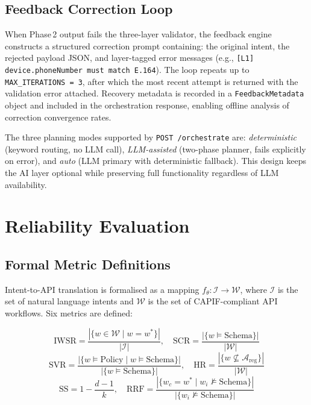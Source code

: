 \documentclass[conference]{IEEEtran}
\begin{document}
\subsection{Feedback Correction Loop}

When Phase\,2 output fails the three-layer validator, the feedback
engine constructs a structured correction prompt containing: the original
intent, the rejected payload JSON, and layer-tagged error messages
(e.g., \texttt{[L1] device.phoneNumber must match E.164}).
The loop repeats up to \texttt{MAX\_ITERATIONS\,=\,3}, after which the
most recent attempt is returned with the validation error attached.
Recovery metadata is recorded in a \texttt{FeedbackMetadata} object and
included in the orchestration response, enabling offline analysis of
correction convergence rates.

The three planning modes supported by \texttt{POST /orchestrate} are:
\textit{deterministic} (keyword routing, no LLM call),
\textit{LLM-assisted} (two-phase planner, fails explicitly on error), and
\textit{auto} (LLM primary with deterministic fallback).
This design keeps the AI layer optional while preserving full
functionality regardless of LLM availability.

\section{Reliability Evaluation}
\label{sec:eval}

\subsection{Formal Metric Definitions}

Intent-to-API translation is formalised as a mapping
$f_\theta : \mathcal{I} \rightarrow \mathcal{W}$,
where $\mathcal{I}$ is the set of natural language intents and
$\mathcal{W}$ is the set of CAPIF-compliant API workflows.
Six metrics are defined:

\begin{equation}
\text{IWSR} = \frac{|\{w \in \mathcal{W} \mid w = w^*\}|}{|\mathcal{I}|}, \quad
\text{SCR} = \frac{|\{w \models \text{Schema}\}|}{|\mathcal{W}|}
\end{equation}
\begin{equation}
\text{SVR} = \frac{|\{w \models \text{Policy} \mid w \models \text{Schema}\}|}{|\{w \models \text{Schema}\}|}, \quad
\text{HR} = \frac{|\{w \not\subseteq \mathcal{A}_{\text{reg}}\}|}{|\mathcal{W}|}
\end{equation}
\begin{equation}
\text{SS} = 1 - \frac{d-1}{k}, \quad
\text{RRF} = \frac{|\{w_c = w^* \mid w_i \not\models \text{Schema}\}|}{|\{w_i \not\models \text{Schema}\}|}
\end{equation}
\end{document}
